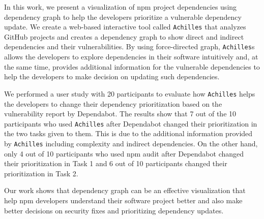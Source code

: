\documentclass[conference]{IEEEtran}
\begin{document}
	In this work, we present a visualization of npm project dependencies using dependency graph to help the developers prioritize a vulnerable dependency update. We create a web-based interactive tool called \texttt{Achilles} that analyzes GitHub projects and creates a dependency graph to show direct and indirect dependencies and their vulnerabilities. By using force-directed graph, \texttt{Achilles}s allows the developers to explore dependencies in their software intuitively and, at the same time, provides additional information for the vulnerable dependencies to help the developers to make decision on updating such dependencies. 
	
	We performed a user study with 20 participants to evaluate how \texttt{Achilles} helps the developers to change their dependency prioritization based on the vulnerability report by Dependabot. The results show that 7 out of the 10 participants who used \texttt{Achilles} after Dependabot changed their prioritization in the two tasks given to them. This is due to the additional information provided by \texttt{Achilles} including complexity and indirect dependencies. On the other hand, only 4 out of 10 participants who used npm audit after Dependabot changed their prioritization in Task 1 and 6 out of 10 participants changed their prioritization in Task 2. 
	
	Our work shows that dependency graph can be an effective visualization that help npm developers understand their software project better and also make better decisions on security fixes and prioritizing dependency updates.
	
	
	
	
	
\end{document}
